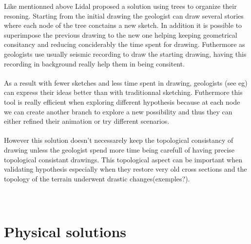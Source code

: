 \documentclass[12pt, a4paper]{report} %
\begin{document}
Like mentionned above Lidal \cite{lidal} proposed a solution using trees to organize their resoning. Starting from the initial drawing the geologist can draw several stories where each node of the tree conctains a new sketch. In addition it is possible to superimpose the previous drawing to the new one helping keeping geometrical consitancy and reducing conciderably the time spent for drawing. Futhermore as geologists use usually seismic recording to draw the starting drawing, having this recording in background really help them in being consitent.\\\\
 As a result with fewer sketches and less time spent in drawing, geologists (see eg) can express their ideas better than with traditionnal sketching. Futhermore this tool is really efficient when exploring different hypothesis  because at each node we can create another branch to explore a new possibility and thus they can either refined their animation or try different scenarios. \\\\
However this solution doesn't necessarely keep the topological consistancy of drawing unless the geologist spend more time being carefull of having precise topological consistant drawings. This topological aspect can be important when validating hypothesis especially when they restore very old cross sections and the topology of the terrain underwent drastic changes(exemples?).\\\\\

\section{Physical solutions}
\end{document}
